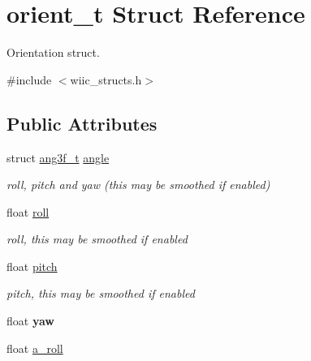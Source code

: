 \hypertarget{structorient__t}{\section{orient\-\_\-t Struct Reference}
\label{structorient__t}
}


Orientation struct.  




{\ttfamily \#include $<$wiic\-\_\-structs.\-h$>$}

\subsection*{Public Attributes}
\begin{DoxyCompactItemize}
\item 
\hypertarget{structorient__t_a0703101bf0e89193a67f55d07e83822e}{struct \hyperlink{structang3f__t}{ang3f\-\_\-t} \hyperlink{structorient__t_a0703101bf0e89193a67f55d07e83822e}{angle}}\label{structorient__t_a0703101bf0e89193a67f55d07e83822e}

\begin{DoxyCompactList}\small\item\em roll, pitch and yaw (this may be smoothed if enabled) \end{DoxyCompactList}\item 
\hypertarget{structorient__t_a86ac41375e9bc5f8d9a36ab5572c1ede}{float \hyperlink{structorient__t_a86ac41375e9bc5f8d9a36ab5572c1ede}{roll}}\label{structorient__t_a86ac41375e9bc5f8d9a36ab5572c1ede}

\begin{DoxyCompactList}\small\item\em roll, this may be smoothed if enabled \end{DoxyCompactList}\item 
\hypertarget{structorient__t_ae2c846c486f4d1438f62fb1178fb3acd}{float \hyperlink{structorient__t_ae2c846c486f4d1438f62fb1178fb3acd}{pitch}}\label{structorient__t_ae2c846c486f4d1438f62fb1178fb3acd}

\begin{DoxyCompactList}\small\item\em pitch, this may be smoothed if enabled \end{DoxyCompactList}\item 
\hypertarget{structorient__t_a76e94fd58466d7e75fc7e16882b31712}{float {\bfseries yaw}}\label{structorient__t_a76e94fd58466d7e75fc7e16882b31712}

\item 
\hypertarget{structorient__t_a735e9cdd4f63ed0e4ecdb3842f2de23d}{float \hyperlink{structorient__t_a735e9cdd4f63ed0e4ecdb3842f2de23d}{a\-\_\-roll}}\label{structorient__t_a735e9cdd4f63ed0e4ecdb3842f2de23d}


\end{DoxyCompactItemize}
